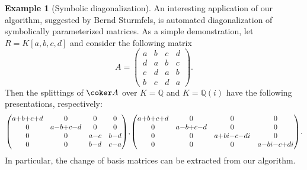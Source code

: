 \documentclass[12pt]{amsart}
\def\QQ{\mathbb Q}
\theoremstyle{theorem}
\numberwithin{thm}{section}
\theoremstyle{definition}
\newtheorem{exa}[thm]{Example}
\newcommand{\mahrud}[1]{{\color{ForestGreen} \sf $\blacklozenge$ Mahrud: [#1]}}
\begin{document}
\begin{exa}[Symbolic diagonalization]\label{ex:diagonalization}
  An interesting application of our algorithm, suggested by Bernd Sturmfels,  is automated diagonalization of symbolically parameterized matrices. As a simple demonstration, let $R = K[a,b,c,d]$ and consider the following matrix
  \[ A = \begin{pmatrix}
    a&b&c&d\\
    d&a&b&c\\
    c&d&a&b\\
    b&c&d&a
  \end{pmatrix}. \]
  Then the splittings of $\coker A$ over $K = \QQ$ and $K = \QQ(i)$ have the following presentations, respectively:
  \[
  \thinmuskip1mu
  \medmuskip0mu \begin{pmatrix}
    a+b+c+d&0&0&0\\
    0&a-b+c-d&0&0\\
    0&0&a-c&b-d\\
    0&0&b-d&c-a
  \end{pmatrix},\,
  \begin{pmatrix}
    a+b+c+d&0&0&0\\
    0&a-b+c-d&0&0\\
    0&0&a+bi-c-di&0\\
    0&0&0&a-bi-c+di
  \end{pmatrix}.
  \]
  In particular, the change of basis matrices can be extracted from our algorithm.
\end{exa}





\end{document}
